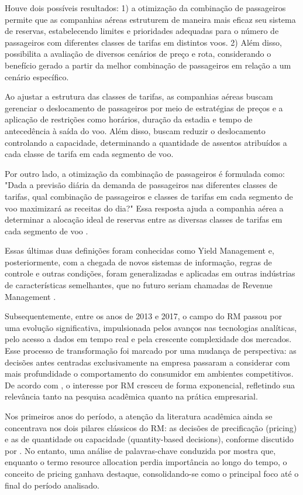 Houve dois possíveis resultados: 1) a otimização da combinação de passageiros permite que as companhias aéreas estruturem de maneira mais eficaz seu sistema de reservas, estabelecendo limites e prioridades adequadas para o número de passageiros com diferentes classes de tarifas em distintos voos. 2) Além disso, possibilita a avaliação de diversos cenários de preço e rota, considerando o benefício gerado a partir da melhor combinação de passageiros em relação a um cenário específico.

Ao ajustar a estrutura das classes de tarifas, as companhias aéreas buscam gerenciar o deslocamento de passageiros por meio de estratégias de preços e a aplicação de restrições como horários, duração da estadia e tempo de antecedência à saída do voo. Além disso, buscam reduzir o deslocamento controlando a capacidade, determinando a quantidade de assentos atribuídos a cada classe de tarifa em cada segmento de voo.

Por outro lado, a otimização da combinação de passageiros é formulada como: "Dada a previsão diária da demanda de passageiros nas diferentes classes de tarifas, qual combinação de passageiros e classes de tarifas em cada segmento de voo maximizará as receitas do dia?" Essa resposta ajuda a companhia aérea a determinar a alocação ideal de reservas entre as diversas classes de tarifas em cada segmento de voo \citep{article_base}.

Essas últimas duas definições foram conhecidas como Yield Management e, posteriormente, com a chegada de novos sistemas de informação, regras de controle e outras condições, foram generalizadas e aplicadas em outras indústrias de características semelhantes, que no futuro seriam chamadas de Revenue Management \citep{article_YM_to_RM}.


Subsequentemente, entre os anos de 2013 e 2017, o campo do RM passou por uma evolução significativa, impulsionada pelos avanços nas tecnologias analíticas, pelo acesso a dados em tempo real e pela crescente complexidade dos mercados. Esse processo de transformação foi marcado por uma mudança de perspectiva: as decisões antes centradas exclusivamente na empresa passaram a considerar com mais profundidade o comportamento do consumidor em ambientes competitivos. De acordo com \citep{Mulyani2021TheFH}, o interesse por RM cresceu de forma exponencial, refletindo sua relevância tanto na pesquisa acadêmica quanto na prática empresarial.

Nos primeiros anos do período, a atenção da literatura acadêmica ainda se concentrava nos dois pilares clássicos do RM: as decisões de precificação (pricing) e as de quantidade ou capacidade (quantity-based decisions), conforme discutido por \citep{talluri2004theory}. No entanto, uma análise de palavras-chave conduzida por \citep{Mulyani2021TheFH} mostra que, enquanto o termo resource allocation perdia importância ao longo do tempo, o conceito de pricing ganhava destaque, consolidando-se como o principal foco até o final do período analisado.

